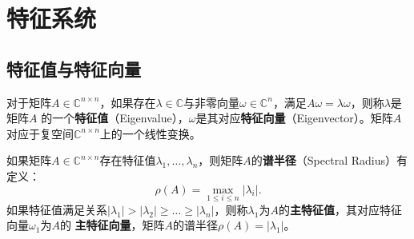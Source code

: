 %

\section{特征系统}

\subsection{特征值与特征向量}
\begin{definition}
对于矩阵$A\in \mathbb C^{n\times n}$，如果存在$\lambda\in \mathbb C$与非零向量$\omega\in \mathbb C^n$，满足$A\omega=\lambda \omega$，则称$\lambda$是矩阵$A$ 的一个\textbf{特征值}（Eigenvalue），$\omega$是其对应\textbf{特征向量}（Eigenvector）。矩阵$A$对应于复空间$\mathbb C^{n\times n}$上的一个线性变换。
\end{definition}

\begin{definition}
如果矩阵$A\in \mathbb C^{n\times n}$存在特征值$\lambda_1,\ldots,\lambda_n$，则矩阵$A$的\textbf{谱半径}（Spectral Radius）有定义：
\begin{equation}
    \rho(A) = \max\limits_{1\le i\le n} |\lambda_i|.
\end{equation}
如果特征值满足关系$|\lambda_1| > |\lambda_2| \ge \dots \ge |\lambda_n|$，则称$\lambda_1$为$A$的\textbf{主特征值}，其对应特征向量$\omega_1$为$A$的
\textbf{主特征向量}，矩阵$A$的谱半径$\rho(A)=|\lambda_1|$。
\end{definition}

